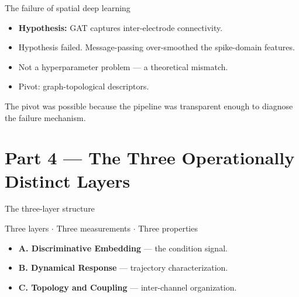 \documentclass[11pt,aspectratio=169]{beamer}
\begin{document}
\begin{frame}{The failure of spatial deep learning}
  \vspace{0.8em}
  \begin{itemize}
    \item \textbf{Hypothesis:} GAT captures inter-electrode connectivity.
    \item \alert{Hypothesis failed.} Message-passing over-smoothed the
      spike-domain features.
    \item Not a hyperparameter problem --- a theoretical mismatch.
    \item Pivot: graph-topological descriptors.
  \end{itemize}
  \vspace{0.8em}
  \begin{center}
    \small\color{sbnavy} The pivot was possible because the pipeline was
    transparent enough to diagnose the failure mechanism.
  \end{center}
\end{frame}

\section{Part 4 --- The Three Operationally Distinct Layers}

\begin{frame}{The three-layer structure}
  \vspace{0.6em}
  \begin{center}\large
    Three layers $\cdot$ Three measurements $\cdot$ Three properties
  \end{center}
  \vspace{1.0em}
  \begin{itemize}
    \item \textbf{A. Discriminative Embedding} --- the condition signal.
    \item \textbf{B. Dynamical Response} --- trajectory characterization.
    \item \textbf{C. Topology and Coupling} --- inter-channel organization.
  \end{itemize}
\end{frame}
\end{document}
